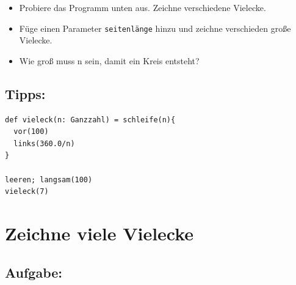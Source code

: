\begin{itemize}

\item {Probiere das Programm unten aus. Zeichne verschiedene Vielecke.}
\item {Füge einen Parameter \lstinline{seitenlänge} hinzu und zeichne verschieden große Vielecke.}
\item {Wie groß muss n sein, damit ein Kreis entsteht?}

\end{itemize}


\section*{\color{OliveGreen}Tipps:}

\begin{lstlisting}[basicstyle={\ttfamily\fontsize{18}{22}\selectfont},numbers=none]
def vieleck(n: Ganzzahl) = schleife(n){
  vor(100)
  links(360.0/n)
}

leeren; langsam(100)
vieleck(7)
\end{lstlisting}
        

  
\chapter{Zeichne viele Vielecke}\section*{\color{BrickRed}Aufgabe:}


